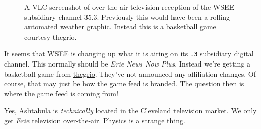 \begin{figure}
\centering
{}
\caption{A VLC screenshot of over-the-air television reception of the
WSEE subsidiary channel 35.3. Previously this would have been a rolling
automated weather graphic. Instead this is a basketball game courtesy
thegrio.}
\end{figure}

It seems that
\href{https://en.wikipedia.org/w/index.php?title=WSEE-TV&oldid=1126015926}{WSEE}
is changing up what it is airing on its \texttt{.3} subsidiary digital
channel. This normally should be \emph{Erie News Now Plus}. Instead
we're getting a basketball game from
\href{https://en.wikipedia.org/w/index.php?title=TheGrio&oldid=1127664863}{thegrio}.
They've not announced any affiliation changes. Of course, that may just
be how the game feed is branded. The question then is where the game
feed is coming from!

Yes, Ashtabula is \emph{technically} located in the Cleveland television
market. We only get \emph{Erie} television over-the-air. Physics is a
strange thing.
